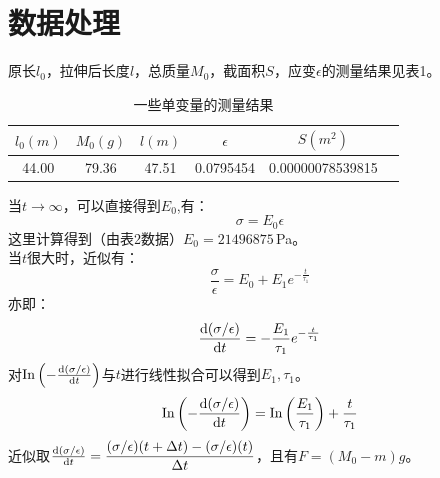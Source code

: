 \documentclass[ctex]{article}
\begin{document}
\section{数据处理}
原长$l_0$，拉伸后长度$l$，总质量$M_0$，截面积$S$，应变$\epsilon$的测量结果见表1。
\begin{table}[htbp]
\centering 
\caption{一些单变量的测量结果}

\begin{tabular}{|c|c|c|c|c|c|}
 \hline   $l_0(m)$&$M_0(g)$&$l(m)$&$\epsilon$&$S(m^2)$  \\ \hline
     44.00&79.36&47.51&0.0795454&0.00000078539815 \\ \hline
\end{tabular}
\end{table}
\par 当$t\rightarrow\infty $，可以直接得到$E_0$,有：
\begin{equation}
    \sigma=E_0\epsilon
\end{equation}
这里计算得到（由表2数据）$E_0=21496875\,$Pa。\\
当$t$很大时，近似有：
\begin{equation}
    \dfrac{\sigma}{\epsilon}=E_0+E_1e^{-\frac{t}{\tau_1}}
\end{equation}
亦即：
\begin{equation}
    \dv{(\sigma/\epsilon)}{t}=-\dfrac{E_1}{\tau_1}e^{-\frac{t}{\tau_1}}
\end{equation}
对$\mathrm{In}\left(-\dv{(\sigma/\epsilon)}{t}\right)$与$t$进行线性拟合可以得到$E_1,\tau_1$。\\
\begin{equation}
    \mathrm{In}\left(-\dv{(\sigma/\epsilon)}{t}\right)=\mathrm{In}\left(\dfrac{E_1}{\tau_1}\right)+\frac{t}{\tau_1}
\end{equation}
近似取$\dv{(\sigma/\epsilon)}{t}(t)=\dfrac{(\sigma/\epsilon)(t+\Delta t)-(\sigma/\epsilon)(t)}{\Delta t}$，且有$F=(M_0-m)g$。\\
\end{document}

